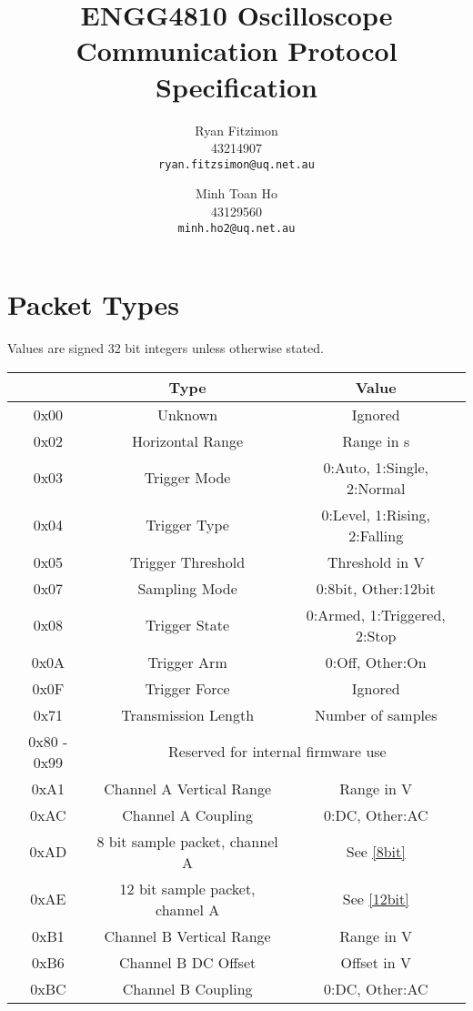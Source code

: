 \documentclass[]{article}
\title{ENGG4810 Oscilloscope Communication Protocol Specification}
\author{
	Ryan Fitzimon\\
	43214907\\
	\texttt{ryan.fitzsimon@uq.net.au}
	\and
	Minh Toan Ho\\
	43129560\\
	\texttt{minh.ho2@uq.net.au}
}
\begin{document}
\maketitle

\section{Packet Types}

Values are signed 32 bit integers unless otherwise stated.

\begin{table}[H]
	 
	 
	\renewcommand{\arraystretch}{1.2}
	\centering
	\begin{tabular}{|>{\ttfamily}c|c|c|}
		\hline
		\normalfont{\textbf{Identifier}} & \textbf{Type} & \textbf{Value} \\ \hline
		0x00 & Unknown & Ignored \\ \hline
		0x02 & Horizontal Range & Range in \textmu s \\ \hline
		0x03 & Trigger Mode & 0:Auto, 1:Single, 2:Normal \\ \hline
		0x04 & Trigger Type & 0:Level, 1:Rising, 2:Falling \\ \hline
		0x05 & Trigger Threshold & Threshold in \textmu V \\ \hline
		0x07 & Sampling Mode & 0:8bit, Other:12bit \\ \hline
		0x08 & Trigger State & 0:Armed, 1:Triggered, 2:Stop \\ \hline
		0x0A & Trigger Arm & 0:Off, Other:On \\ \hline 
		0x0F & Trigger Force & Ignored \\ \hline 
		0x71 & Transmission Length & Number of samples \\ \hline
		0x80 - 0x99 & \multicolumn{2}{c|}{Reserved for internal firmware use} \\ \hline
		0xA1 & Channel A Vertical Range & Range in \textmu V \\ \hline
		0xAC & Channel A Coupling & 0:DC, Other:AC \\ \hline
		0xAD & 8 bit sample packet, channel A & See \autoref{8bit} \\ \hline
		0xAE & 12 bit sample packet, channel A & See \autoref{12bit} \\ \hline
		0xB1 & Channel B Vertical Range & Range in \textmu V \\ \hline
		0xB6 & Channel B DC Offset & Offset in \textmu V \\ \hline
		0xBC & Channel B Coupling & 0:DC, Other:AC \\ \hline

\end{tabular}
\end{table}
\end{document}
